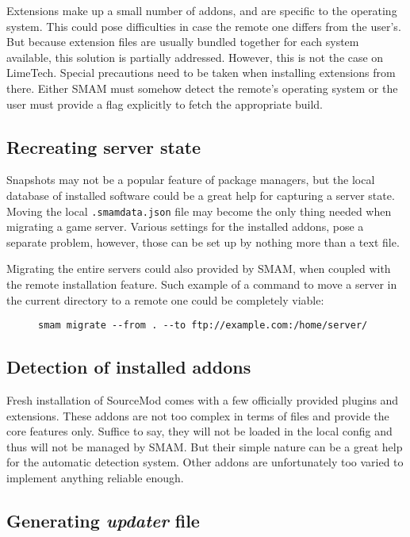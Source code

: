 Extensions make up a small number of addons, and are specific to the operating system.
This could pose difficulties in case the remote one differs from the user's.
But because extension files are usually bundled together for each system available, this solution is partially addressed.
However, this is not the case on LimeTech.
Special precautions need to be taken when installing extensions from there.
Either SMAM must somehow detect the remote's operating system or the user must provide a flag explicitly to fetch the appropriate build.

\subsection{Recreating server state}

Snapshots may not be a popular feature of package managers, but the local database of installed software could be a great help for capturing a server state.
Moving the local \verb|.smamdata.json| file may become the only thing needed when migrating a game server.
Various settings for the installed addons, pose a separate problem, however, those can be set up by nothing more than a text file.

Migrating the entire servers could also provided by SMAM, when coupled with the remote installation feature.
Such example of a command to move a server in the current directory to a remote one could be completely viable:

\begin{figure}[htp]
\centering
\verb|smam migrate --from . --to ftp://example.com:/home/server/|
\end{figure}

\subsection{Detection of installed addons}

Fresh installation of SourceMod comes with a few officially provided plugins and extensions.
These addons are not too complex in terms of files and provide the core features only.
Suffice to say, they will not be loaded in the local config and thus will not be managed by SMAM\@.
But their simple nature can be a great help for the automatic detection system.
Other addons are unfortunately too varied to implement anything reliable enough.

\subsection{Generating \textit{updater} file}

